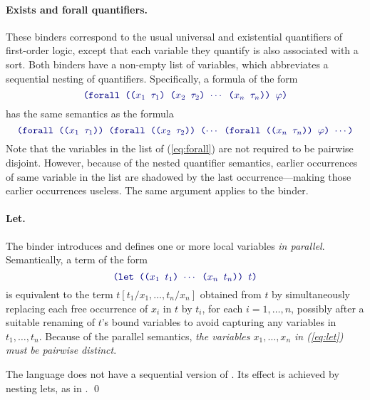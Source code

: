 \paragraph{Exists and forall quantifiers.}
These binders correspond 
to the usual universal and existential quantifiers of first-order logic,
except that each variable they quantify is also associated with a sort.
Both binders have a non-empty list of variables, 
which abbreviates a sequential nesting of quantifiers.
Specifically, a formula of the form
%
\begin{equation} \label{eq:forall}
\expr{
(forall (($x_1$ $\tau_1$) ($x_2$ $\tau_2$) $\cdots$ ($x_n$ $\tau_n$)) 
  $\varphi$)
}
\end{equation}
%
has the same semantics as the formula
%
\begin{equation} \label{eq:nested-forall}
\expr{
 (forall (($x_1$ $\tau_1$)) 
 (forall (($x_2$ $\tau_2$)) ($\cdots$ 
 (forall (($x_n$ $\tau_n$)) $\varphi$) $\cdots$)
}
\end{equation}
%
Note that the variables in the list 
of (\ref{eq:forall}) are not required to be pairwise disjoint.
However, because of the nested quantifier semantics, earlier occurrences 
of same variable in the list are shadowed by the last occurrence---making 
those earlier occurrences useless.
The same argument applies to the  binder.

\paragraph{Let.}
The  binder introduces and defines 
one or more local variables \emph{in parallel}.
Semantically, a term of the form
%
\begin{equation} \label{eq:let}
\expr{(let (($x_1$ $t_1$) $\cdots$ ($x_n$ $t_n$)) $t$)}
\end{equation}
%
is equivalent to the term $t[t_1/x_1, \ldots, t_n/x_n]$ obtained from $t$ 
by simultaneously replacing each free occurrence of $x_i$ in $t$ by $t_i$, 
for each $i=1,\ldots,n$,
possibly after a suitable renaming of $t$'s bound variables 
to avoid capturing any variables in $t_1, \ldots, t_n$.
Because of the parallel semantics, 
\emph{the variables $x_1, \ldots, x_n$ in (\ref{eq:let}) must be pairwise distinct}.

\begin{remark}
The language does not have a sequential version of .
Its effect is achieved by nesting lets, as in 
.
\qed
\end{remark}

